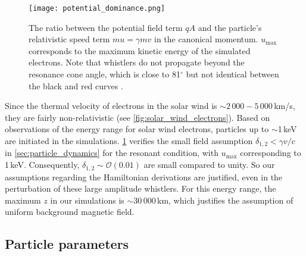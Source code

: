 \begin{figure}
    \centering
    \texttt{[image: potential\_dominance.png]}
    \caption{The ratio between the potential field term $qA$ and the
        particle's relativistic speed term $mu=\gamma mv$ in the canonical
    momentum. $u_{\max}$ corresponds to the maximum kinetic energy of the
simulated electrons. Note that whistlers do not propagate beyond the resonance
cone angle, which is close to 81$^\circ$ but not identical between the black and red
curves \citep{Remya2016}.}
    \label{fig:potential_dominance}
\end{figure}

Since the thermal velocity of electrons in the solar wind is
$\sim2\,000-5\,000$\,\si{km/s}, they are fairly non-relativistic (see
\cref{fig:solar_wind_electrons}). Based on observations of the energy range
for solar wind electrons, particles up to
$\sim$1\,\si{keV} are initiated in the simulations. \cref{fig:potential_dominance} verifies
the small field assumption $\delta_{1,2}<\gamma v/c$ in
\cref{sec:particle_dynamics} for the resonant condition, with $u_{\max}$
corresponding to 1\,\si{keV}. Consequently, $\delta_{1,2}\sim\mathcal{O}(0.01)$
are small compared to unity. So our assumptions regarding the Hamiltonian
derivations are justified, even in the perturbation of these large amplitude
whistlers. For this energy range, the maximum $z$ in our simulations is $\sim30\,000$\,\si{km}, which justifies the assumption of uniform background magnetic field.


\subsection{Particle parameters}



